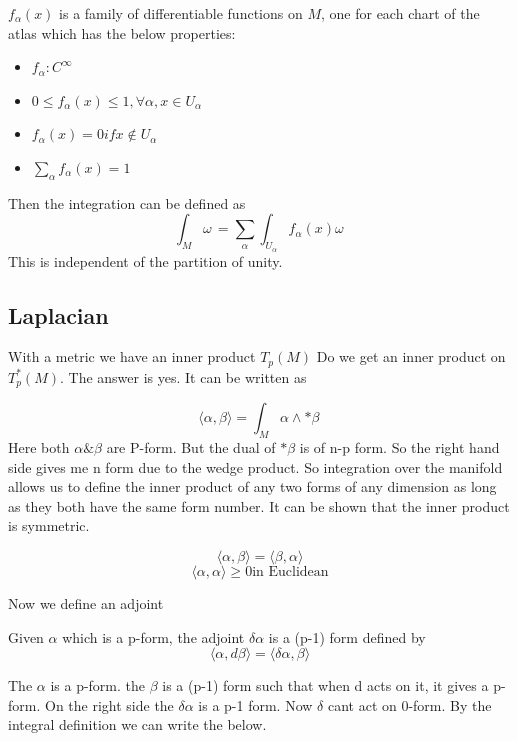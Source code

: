 \documentclass{article}
\begin{document}
\begin{theorem}
    \( f_\alpha (x) \) is a family of differentiable functions on \( M \), one for each chart of the atlas which has the below properties: 
    \begin{itemize}
        \item \( f_\alpha: C^{\infty} \)
        \item \( 0\leq f_\alpha(x) \leq 1, \forall \alpha,x \in U_\alpha \)    
        \item \( f_\alpha(x) = 0 if x \not\in U_\alpha\)
        \item \( \sum_{\alpha}^{} f_\alpha(x) = 1 \)
    \end{itemize}
\end{theorem}

Then the integration can be defined as 
\[ \int_{M}^{} \omega\, = \sum_{\alpha}^{} \int_{U_\alpha}^{} f_\alpha(x) \omega\, \]
This is independent of the partition of unity. 

\subsection{Laplacian}
With a metric we have an inner product \( T_p(M) \) Do we get an inner product on \( T_p^{*}(M) \). The answer is yes. It can be written as 

\[ \langle \alpha, \beta \rangle = \int_{M}^{} \alpha \wedge *\beta \, \]
Here both \( \alpha \& \beta \) are P-form. But the dual of \( *\beta \) is of n-p form. So the right hand side gives me n form due to the wedge product. So integration over the manifold allows us to define the inner product of any two forms of any dimension as long as they both have the same form number. It can be shown that the inner product is symmetric. 

\[ \langle \alpha, \beta \rangle = \langle \beta, \alpha \rangle  \]
\[ \langle \alpha, \alpha \rangle \geq 0 \text{in Euclidean} \]

Now we define an adjoint 
\begin{theorem}
    Given \( \alpha \) which is a p-form, the adjoint \( \delta \alpha \) is a (p-1) form defined by 
    \[ \langle \alpha, d\beta \rangle = \langle \delta \alpha, \beta \rangle  \]
\end{theorem}
The \( \alpha  \) is a p-form. the \( \beta \) is a (p-1) form such that when d acts on it, it gives a p-form. On the right side the \( \delta \alpha \) is a p-1 form. Now \( \delta \) cant act on 0-form. By the integral definition we can write the below. 
\end{document}
